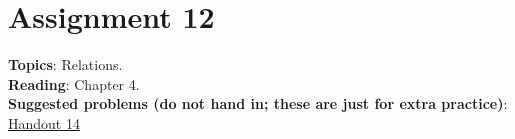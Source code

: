 \documentclass[12pt]{article}
\newcommand{\warning}{
\smallskip
\begin{center}
  {\color{red} {\huge\Stopsign} \hspace{1pt}  IN PROGRESS!} {\color{blue}Check back later for the final assignment.} {\color{red} {\huge\Stopsign} }
\end{center}
\smallskip
\AddToShipoutPictureBG*{\AtTextLowerLeft{\llap{\rotatebox[origin=lb]{90}{\large\sffamily\hspace{2.5in}
  {\color{red} {\huge\Stopsign} \hspace{1pt}  IN PROGRESS!} {\color{blue}Check back later for the final assignment.} {\color{red} {\huge\Stopsign} }
      }\quad\rule{0.8pt}{\textheight}\enspace}}}
}
\begin{document}
\newpage
\section[12 (due \csname dateWeek12\endcsname): Relations]{Assignment 12}


\noindent\textbf{Topics}: Relations.
\\

\noindent \textbf{Reading}: Chapter 4.
\\

\noindent \textbf{Suggested problems (do not hand in; these are just for extra practice)}:
\href{https://www.math.emory.edu/~dzb/teaching/250Fall2021/handouts/250-H14-equivalence-relations.pdf}{Handout 14}
\\
\end{document}
